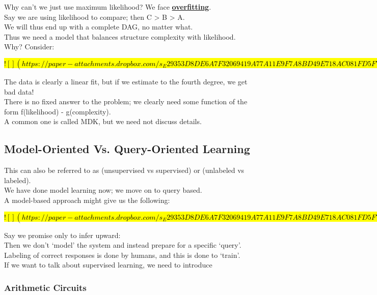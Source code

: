 \documentclass[../../lecture_notes.tex]{subfiles}
\begin{document}
\noindent Why can’t we just use maximum likelihood? We face \textbf{\underline{overfitting}}.\\
Say we are using likelihood to compare; then C > B > A.\\
	\indent We will thus end up with a complete DAG, no matter what.\\
	\indent Thus we need a model that balances structure complexity with likelihood.\\
	\indent Why? Consider:

\hl{
$![](https://paper-attachments.dropbox.com/s_E29353D8DE6A7F32069419A77A11E9F7A8BD49E718AC081FD5F77701FB86FF68_1590909021630_Untitled+drawing+5.jpg)$
}

\noindent The data is clearly a linear fit, but if we estimate to the fourth degree, we get bad data!\\
There is no fixed answer to the problem; we clearly need some function of the form f(likelihood) - g(complexity).\\
A common one is called MDK, but we need not discuss details.\\

\subsection*{Model-Oriented Vs. Query-Oriented Learning}
\noindent This can also be referred to as (unsupervised vs supervised) or (unlabeled vs labeled).\\
We have done model learning now; we move on to query based.\\
	\indent A model-based approach might give us the following:

\hl{
$![](https://paper-attachments.dropbox.com/s_E29353D8DE6A7F32069419A77A11E9F7A8BD49E718AC081FD5F77701FB86FF68_1590909614270_Untitled+drawing+6.jpg)$
}

\noindent Say we promise only to infer upward:\\
	\indent  Then we don’t ‘model’ the system and instead prepare for a specific ‘query’.\\
	\indent Labeling of correct responses is done by humans, and this is done to ‘train’.\\
	\indent If we want to talk about supervised learning, we need to introduce

\subsubsection*{Arithmetic Circuits}
\end{document}
